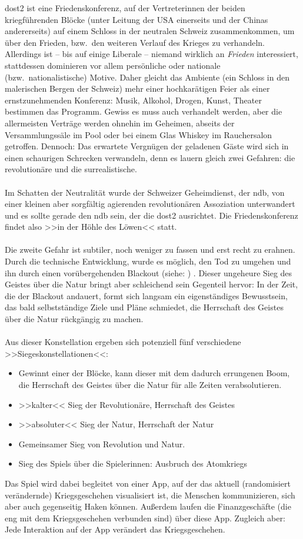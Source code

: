 \ac{dost2} ist eine Friedenskonferenz, auf der Vertreterinnen der beiden
kriegführenden Blöcke (unter Leitung der USA einerseits und der Chinas
andererseits) auf einem Schloss in der neutralen Schweiz zusammenkommen, 
um über den Frieden, bzw.~den weiteren Verlauf des Krieges zu verhandeln.
Allerdings ist -- bis auf einige Liberale -- niemand wirklich an \emph{Frieden}
interessiert, stattdessen dominieren vor allem persönliche oder nationale
(bzw.~nationalistische) Motive. Daher gleicht das Ambiente (ein Schloss in den
malerischen Bergen der Schweiz) mehr einer hochkarätigen Feier als einer
ernstzunehmenden Konferenz: Musik, Alkohol, Drogen, Kunst, Theater bestimmen das
Programm. Gewiss es muss auch verhandelt werden, aber die allermeisten Verträge
werden ohnehin im Geheimen, abseits der Versammlungssäle im Pool oder bei einem
Glas Whiskey im Rauchersalon getroffen. Dennoch: Das erwartete Vergnügen der
geladenen Gäste wird sich in einen schaurigen Schrecken verwandeln, denn es
lauern gleich zwei Gefahren: die revolutionäre und die surrealistische.\\\\
%
Im Schatten der Neutralität wurde der Schweizer Geheimdienst, der \ac{ndb}, von
einer kleinen aber sorgfältig agierenden revolutionären Assoziation
unterwandert und es sollte gerade den \ac{ndb} sein, der die \ac{dost2}
ausrichtet. Die Friedenskonferenz findet also >>in der Höhle des Löwen<<
statt.\\\\
%
Die zweite Gefahr ist subtiler, noch weniger zu fassen und erst recht zu
erahnen. Durch die technische Entwicklung, wurde es möglich, den Tod zu umgehen
und ihn durch einen vorübergehenden Blackout (siehe: )
. 
Dieser ungeheure Sieg des Geistes über die Natur bringt aber schleichend sein
Gegenteil hervor: In der Zeit, die der Blackout andauert, formt sich langsam ein
eigenständiges Bewusstsein, das bald selbstständige Ziele und Pläne schmiedet,
die Herrschaft des Geistes über die Natur rückgängig zu machen.\\\\
%
Aus dieser Konstellation ergeben sich potenziell fünf verschiedene
>>Siegeskonstellationen<<: 
\begin{itemize} 
  \item[] Gewinnt einer der Blöcke, kann dieser mit dem dadurch errungenen Boom,
    die Herrschaft des Geistes über die Natur für alle Zeiten verabsolutieren.
  \item[] >>kalter<< Sieg der Revolutionäre, Herrschaft des Geistes
  \item[] >>absoluter<< Sieg der Natur, Herrschaft der Natur
  \item[] Gemeinsamer Sieg von Revolution und Natur. 
  \item[] Sieg des Spiels über die Spielerinnen: Ausbruch des Atomkriegs
\end{itemize}
Das Spiel wird dabei begleitet von einer App, auf der das aktuell
(randomisiert verändernde) Kriegsgeschehen visualisiert ist, die Menschen
kommunizieren, sich aber auch gegenseitig Haken können. Außerdem laufen die
Finanzgeschäfte (die eng mit dem Kriegsgeschehen verbunden sind) über diese App.
Zugleich aber: Jede Interaktion auf der App verändert das Kriegsgeschehen.
